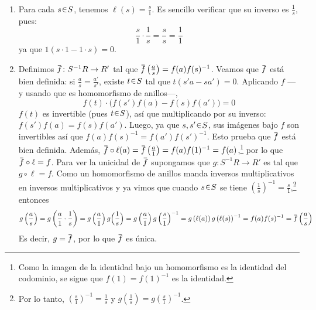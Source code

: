 \begin{sol}[Demostración]
\begin{enumerate}[label=(\alph*)]
\begin{itemize}
\item \emph{Conmutatividad del producto.}
\[
\frac{a}{s}\cdot\frac{b}{t}=\frac{ab}{st}=\frac{ba}{ts}=\frac{b}{t}\cdot\frac{a}{s}
\]
\end{itemize}
Hemos demostrado que $S^{-1}R$ satisface todos los axiomas de anillo conmutativo con identidad. Ahora veamos que $\ell \colon R \to S^{-1}R$ con $a \mapsto \tfrac{a}{1}$ es homomorfismo de anillos.
\begin{itemize}
\item $\ell(a+b) = \frac{a+b}{1} = \frac{a}{1} + \frac{b}{1} = \ell(a) + \ell(b)$.

\item $\ell(ab) = \frac{ab}{1} = \frac{a}{1} \cdot \frac{b}{1} = \ell(a)\ell(b)$.

\item $\ell(1) = \frac{1}{1}$, que es el neutro multiplicativo.
\end{itemize}

\item Para cada $s \en S$, tenemos $\ell(s) = \frac{s}{1}$. Es sencillo verificar que su inverso es $\frac{1}{s}$, pues:
\[
\frac{s}{1} \cdot \frac{1}{s} = \frac{s}{s} = \frac{1}{1}
\]
ya que $1(s\cdot 1 - 1\cdot s) = 0$.

\item Definimos $\ubar{f} \colon S^{-1}R \to R'$ tal que $\ubar{f}\left(\frac{a}{s}\right) = f(a)f(s)^{-1}$. Veamos que $\ubar{f}$ está bien definida: si $\frac{a}{s} = \frac{a'}{s'}$, existe $t \en S$ tal que $t(s'a - sa') = 0$. Aplicando $f$ ---y usando que es homomorfismo de anillos---,
\[
f(t)\cdot\big(f(s')f(a) - f(s)f(a')\big) = 0
\]
$f(t)$ es invertible (pues $t \en S$), así que multiplicando por su inverso: $f(s')f(a) = f(s)f(a')$. Luego, ya que $s,s'\en S$, sus imágenes bajo $f$ son invertibles así que $f(a)f(s)^{-1} = f(a')f(s')^{-1}$. Esto prueba que $\ubar{f}$ está bien definida. Además, $\ubar{f} \circ \ell(a) = \ubar{f}\left(\frac{a}{1}\right) = f(a)f(1)^{-1} = f(a)$,\footnote{Como la imagen de la identidad bajo un homomorfismo es la identidad del codominio, se sigue que $f(1) = f(1)^{-1}$ es la identidad.} por lo que $\ubar{f} \circ\ell = f$. Para ver la unicidad de $\ubar{f}$ supongamos que $g \colon S^{-1}R \to R'$ es tal que $g \circ \ell = f$. Como un homomorfismo de anillos manda inversos multiplicativos en inversos multiplicativos y ya vimos que cuando $s \en S$ se tiene $(\frac{1}{s})^{-1} = \frac{s}{1}$,\footnote{Por lo tanto, $(\frac{s}{1})^{-1} = \frac{1}{s}$ y $g(\frac{1}{s}) = g(\frac{s}{1})^{-1}$.} entonces
\[
g\left(\frac{a}{s}\right)%
= g\left(\frac{a}{1}\cdot\frac{1}{s}\right)%
= g\left(\frac{a}{1}\right)g\Big(\frac{1}{s}\Big)%
= g\left(\frac{a}{1}\right)g\left(\frac{s}{1}\right)^{-1}%
= g\left(\ell(a)\right)g\left(\ell(s)\right)^{-1}%
= f(a)f(s)^{-1}%
= \ubar{f}\left(\frac{a}{s}\right)
\]
Es decir, $g = \ubar{f}$, por lo que $\ubar{f}$ es única.


\end{enumerate}
\end{sol}
